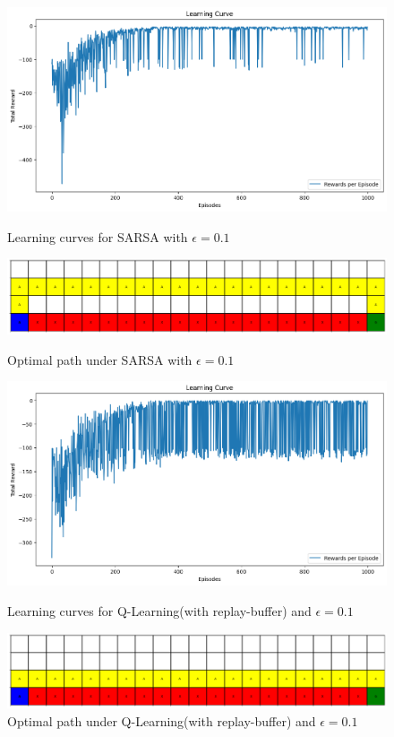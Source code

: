 \documentclass[12pt]{article}
\begin{document}
\begin{figure}[ht]
    \centering
    \begin{minipage}[b]{0.48\textwidth}
        \centering
        \includegraphics[width=\textwidth]{image/L1.1.png}
        \caption{\scriptsize Learning curves for SARSA with \(\epsilon=0.1\)}
        \includegraphics[width=\textwidth]{image/R1.1.png}
        \caption{\scriptsize Optimal path under SARSA with \(\epsilon=0.1\)}
    \end{minipage}
    \hfill
    \begin{minipage}[b]{0.48\textwidth}
        \centering
        \includegraphics[width=\textwidth]{image/L1.2.png}
        \caption{\scriptsize Learning curves for Q-Learning(with replay-buffer) and \(\epsilon=0.1\)}
        \includegraphics[width=\textwidth]{image/R1.2.png}
        \caption{\scriptsize Optimal path under Q-Learning(with replay-buffer) and \(\epsilon=0.1\)}
    \end{minipage}
\end{figure}
\end{document}
